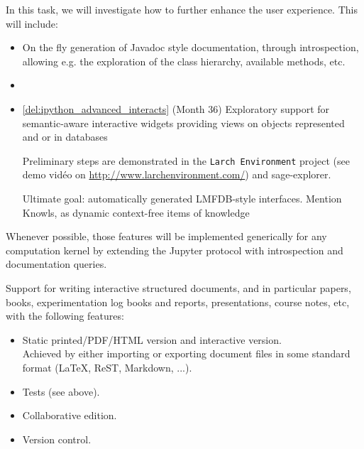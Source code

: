 \begin{workpackage}[id=UI,wphases=24-48,
  title=User Interfaces,
  PSRM=1,
  JURM=12, %
  LLRM=1, %
  SARM=1, %
  UKRM=1, %
  UBRM=1, %
  USORM=25]
\begin{tasklist}
\begin{task}[title=Dynamic documentation and exploration system]
  In this task, we will investigate how to further enhance the user
  experience. This will include:

  \begin{itemize}
  \item On the fly generation of Javadoc style documentation, through
    introspection, allowing e.g. the exploration of the class
    hierarchy, available methods, etc.
  \item {}
  \item \ref{del:ipython_advanced_interacts} (Month 36) Exploratory
    support for semantic-aware interactive widgets providing views on
    objects represented and or in databases

    Preliminary steps are demonstrated in the \texttt{Larch
      Environment} project (see demo vidéo on
    \url{http://www.larchenvironment.com/}) and sage-explorer.

    Ultimate goal: automatically generated LMFDB-style interfaces.
    Mention Knowls, as dynamic context-free items of knowledge
  \end{itemize}




  Whenever possible, those features will be implemented generically
  for any computation kernel by extending the Jupyter protocol with
  introspection and documentation queries.

\end{task}

\begin{task}[title=Structured documents]
  Support for writing interactive structured documents, and in
  particular papers, books, experimentation log books and reports,
  presentations, course notes, etc, with the following features:
  \begin{itemize}
  \item Static printed/PDF/HTML version and interactive version.\\
    Achieved by either importing or exporting document files in some
    standard format (LaTeX, ReST, Markdown, ...).
  \item Tests (see above).
  \item Collaborative edition.
  \item Version control.
  \end{itemize}
\end{task}
\end{tasklist}


\end{workpackage}
